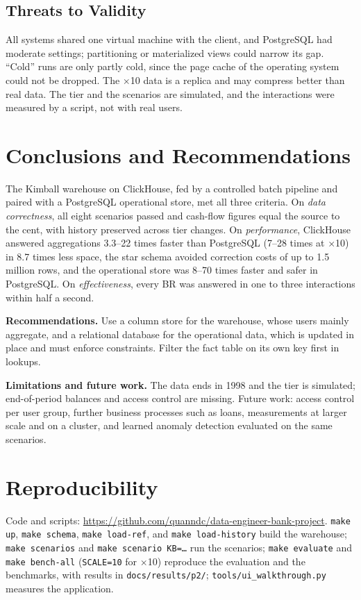 \documentclass[peerreview]{IEEEtran}
\begin{document}
\subsection{Threats to Validity}
All systems shared one virtual machine with the client, and PostgreSQL had moderate settings;
partitioning or materialized views could narrow its gap. ``Cold'' runs are only partly cold,
since the page cache of the operating system could not be dropped. The $\times$10 data is a
replica and may compress better than real data. The tier and the scenarios are simulated, and
the interactions were measured by a script, not with real users.


\section{Conclusions and Recommendations}
\label{sec:conclusion}

The Kimball warehouse on ClickHouse, fed by a controlled batch pipeline and paired with a
PostgreSQL operational store, met all three criteria. On \emph{data correctness}, all eight
scenarios passed and cash-flow figures equal the source to the cent, with history preserved
across tier changes. On \emph{performance}, ClickHouse answered aggregations 3.3--22 times
faster than PostgreSQL (7--28 times at $\times$10) in 8.7 times less space, the star schema
avoided correction costs of up to 1.5 million rows, and the operational store was 8--70 times
faster and safer in PostgreSQL. On \emph{effectiveness}, every BR was answered in one to three
interactions within half a second.

\textbf{Recommendations.} Use a column store for the warehouse, whose users mainly aggregate,
and a relational database for the operational data, which is updated in place and must
enforce constraints. Filter the fact table on its own key first in lookups.

\textbf{Limitations and future work.} The data ends in 1998 and the tier is simulated;
end-of-period balances and access control are missing. Future work: access control per user
group, further business processes such as loans, measurements at larger scale and on a
cluster, and learned anomaly detection evaluated on the same scenarios.


\appendices

\section{Reproducibility}
\label{App:Reproducibility}
Code and scripts: \url{https://github.com/quanndc/data-engineer-bank-project}.
\texttt{make up}, \texttt{make schema}, \texttt{make load-ref}, and \texttt{make load-history}
build the warehouse; \texttt{make scenarios} and \texttt{make scenario KB=\ldots} run the
scenarios; \texttt{make evaluate} and \texttt{make bench-all} (\texttt{SCALE=10} for
$\times$10) reproduce the evaluation and the benchmarks, with results in
\texttt{docs/results/p2/}; \texttt{tools/ui\_walkthrough.py} measures the application.
\end{document}
